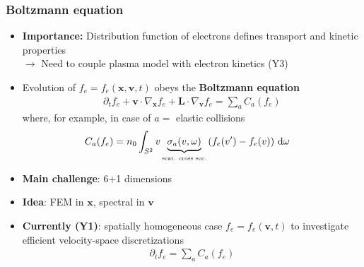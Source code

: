 \documentclass[mathserif, aspectratio=169]{beamer}
\newcommand{\ud}{\,\mathrm{d}}
\newcommand{\vect}[1]{\boldsymbol{#1}}
\begin{document}
\begin{frame}
\frametitle{Boltzmann equation}
%
\begin{itemize}
\item \textbf{Importance:} 
Distribution function of electrons defines transport and kinetic properties
\\
$\rightarrow$ Need to couple plasma model with electron kinetics (Y3)
\item Evolution of $f_e = f_e(\vect{x}, \vect{v}, t)$ obeys the \textbf{Boltzmann equation}
\small
\begin{align*}
\partial_t f_e + \vect{v}\cdot \nabla_{\vect{x}} f_e  + \vect{L} \cdot \nabla_{\vect{v }}f_e = \sum_{a} C_a(f_e)
\end{align*}
where, for example, in case of $a=$ elastic collisions
\begin{align*}
C_a(f_e) &= n_0\int_{S^2} v \underbrace{\sigma_a(v,\omega)}_{\tiny\text{\tiny scat. cross sec.}} 
\left( f_e(v^\prime) - f_e(v) \right) \ud \omega 
\end{align*}
\item \textbf{Main challenge}: 6+1 dimensions
\item \textbf{Idea}: FEM in $\vect{x}$, spectral in $\vect{v}$
\item \textbf{Currently (Y1)}: spatially homogeneous case $f_e = f_e(\vect{v}, t)$ to investigate efficient velocity-space discretizations
\begin{align*}
\partial_t f_e = \sum_{a} C_a(f_e)
\end{align*}
\end{itemize}
%
\end{frame}
%
\end{document}
